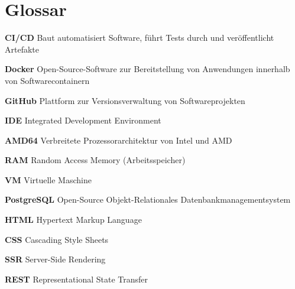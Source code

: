 
\chapter{Glossar}

\item \textbf{CI/CD} Baut automatisiert Software, führt Tests durch und veröffentlicht Artefakte
\item \textbf{Docker} Open-Source-Software zur Bereitstellung von Anwendungen innerhalb von Softwarecontainern
\item \textbf{GitHub} Plattform zur Versionsverwaltung von Softwareprojekten
\item \textbf{IDE} Integrated Development Environment
\item \textbf{AMD64} Verbreitete Prozessorarchitektur von Intel und AMD
\item \textbf{RAM} Random Access Memory (Arbeitsspeicher)
\item \textbf{VM} Virtuelle Maschine
\item \textbf{PostgreSQL} Open-Source Objekt-Relationales Datenbankmanagementsystem
\item \textbf{HTML} Hypertext Markup Language
\item \textbf{CSS} Cascading Style Sheets
\item \textbf{SSR} Server-Side Rendering
\item \textbf{REST} Representational State Transfer
